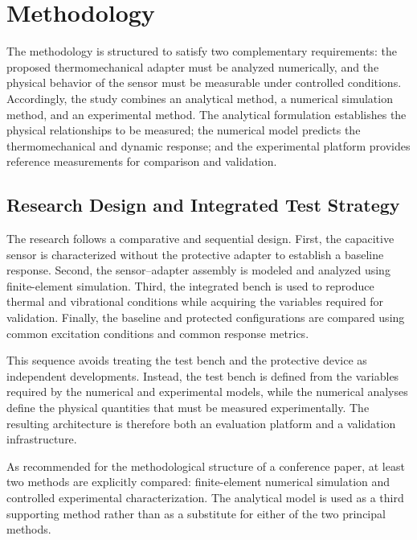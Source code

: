 \documentclass[conference]{IEEEtran}
\begin{document}

\section{Methodology}

The methodology is structured to satisfy two complementary requirements: the proposed thermomechanical adapter must be analyzed numerically, and the physical behavior of the sensor must be measurable under controlled conditions. Accordingly, the study combines an analytical method, a numerical simulation method, and an experimental method. The analytical formulation establishes the physical relationships to be measured; the numerical model predicts the thermomechanical and dynamic response; and the experimental platform provides reference measurements for comparison and validation.

\subsection{Research Design and Integrated Test Strategy}

The research follows a comparative and sequential design. First, the capacitive sensor is characterized without the protective adapter to establish a baseline response. Second, the sensor--adapter assembly is modeled and analyzed using finite-element simulation. Third, the integrated bench is used to reproduce thermal and vibrational conditions while acquiring the variables required for validation. Finally, the baseline and protected configurations are compared using common excitation conditions and common response metrics.

This sequence avoids treating the test bench and the protective device as independent developments. Instead, the test bench is defined from the variables required by the numerical and experimental models, while the numerical analyses define the physical quantities that must be measured experimentally. The resulting architecture is therefore both an evaluation platform and a validation infrastructure.

As recommended for the methodological structure of a conference paper, at least two methods are explicitly compared: finite-element numerical simulation and controlled experimental characterization. The analytical model is used as a third supporting method rather than as a substitute for either of the two principal methods.
\end{document}
